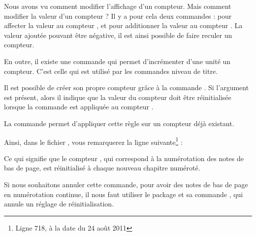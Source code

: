 Nous avons vu comment modifier l'affichage d'un compteur. Mais comment modifier la valeur d'un compteur ? Il y a pour cela deux commandes :  pour affecter la valeur  au compteur , et  pour additionner la valeur  au compteur . La valeur ajoutée pouvant être négative, il est ainsi possible de faire reculer un compteur.

En outre, il existe une commande  qui permet d'incrémenter d'une unité un compteur. C'est celle qui est utilisé par les commandes niveau de titre.



Il est possible de créer son propre compteur grâce à la commande . Si l'argument  est présent, alors il indique que la valeur du compteur  doit être réinitialisée lorsque la commande  est appliquée au compteur .

La commande    permet d'appliquer cette règle sur un compteur déjà existant.

Ainsi, dans le fichier , vous remarquerez la ligne suivante\footnote{Ligne 718, à la date du 24 août 2011}  :

\begin{latexcode}
\end{latexcode} 

Ce qui signifie que le compteur  , qui correspond à la numérotation des notes de bas de page, est réinitialisé à chaque nouveau chapitre numéroté. 

Si nous souhaitons annuler cette commande, pour avoir des notes de bas de page en numérotation continue, il nous faut utiliser le package  et sa commande , qui annule un réglage de réinitialisation.

\begin{latexcode}
\usepackage{remreset}
\makeatletter
{}
\makeatother
\end{latexcode}
